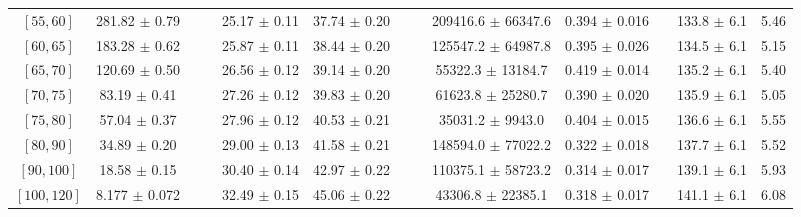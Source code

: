 \begin{tabular}{c||c|c|c|c|c|c|c|c|c|c|c||c}
$[55, 60]$ & 281.82 $\pm$ 0.79 &  &  & 25.17 $\pm$ 0.11 & 37.74 $\pm$ 0.20 &  &  & 209416.6 $\pm$ 66347.6 & 0.394 $\pm$ 0.016 &  & 133.8 $\pm$ 6.1 & 5.46\\
$[60, 65]$ & 183.28 $\pm$ 0.62 &  &  & 25.87 $\pm$ 0.11 & 38.44 $\pm$ 0.20 &  &  & 125547.2 $\pm$ 64987.8 & 0.395 $\pm$ 0.026 &  & 134.5 $\pm$ 6.1 & 5.15\\
$[65, 70]$ & 120.69 $\pm$ 0.50 &  &  & 26.56 $\pm$ 0.12 & 39.14 $\pm$ 0.20 &  &  & 55322.3 $\pm$ 13184.7 & 0.419 $\pm$ 0.014 &  & 135.2 $\pm$ 6.1 & 5.40\\
$[70, 75]$ & 83.19 $\pm$ 0.41 &  &  & 27.26 $\pm$ 0.12 & 39.83 $\pm$ 0.20 &  &  & 61623.8 $\pm$ 25280.7 & 0.390 $\pm$ 0.020 &  & 135.9 $\pm$ 6.1 & 5.05\\
$[75, 80]$ & 57.04 $\pm$ 0.37 &  &  & 27.96 $\pm$ 0.12 & 40.53 $\pm$ 0.21 &  &  & 35031.2 $\pm$ 9943.0 & 0.404 $\pm$ 0.015 &  & 136.6 $\pm$ 6.1 & 5.55\\
$[80, 90]$ & 34.89 $\pm$ 0.20 &  &  & 29.00 $\pm$ 0.13 & 41.58 $\pm$ 0.21 &  &  & 148594.0 $\pm$ 77022.2 & 0.322 $\pm$ 0.018 &  & 137.7 $\pm$ 6.1 & 5.52\\
$[90, 100]$ & 18.58 $\pm$ 0.15 &  &  & 30.40 $\pm$ 0.14 & 42.97 $\pm$ 0.22 &  &  & 110375.1 $\pm$ 58723.2 & 0.314 $\pm$ 0.017 &  & 139.1 $\pm$ 6.1 & 5.93\\
$[100, 120]$ & 8.177 $\pm$ 0.072 &  &  & 32.49 $\pm$ 0.15 & 45.06 $\pm$ 0.22 &  &  & 43306.8 $\pm$ 22385.1 & 0.318 $\pm$ 0.017 &  & 141.1 $\pm$ 6.1 & 6.08\\
\end{tabular}
